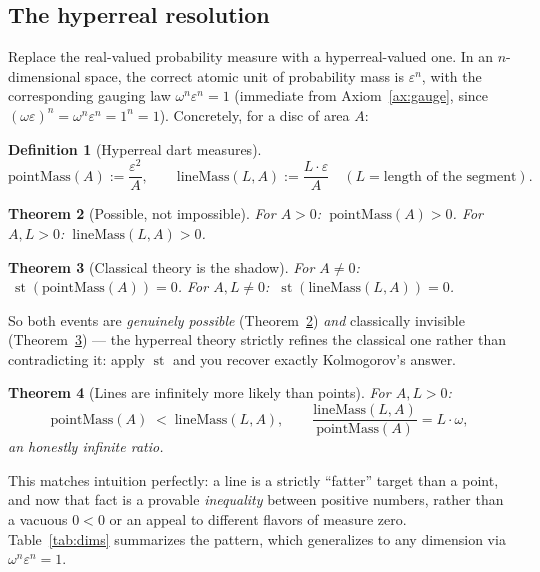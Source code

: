 \documentclass[11pt]{article}
\newtheorem{theorem}{Theorem}[section]
\theoremstyle{definition}
\newtheorem{definition}[theorem]{Definition}
\theoremstyle{remark}
\newcommand{\eps}{\varepsilon}
\newcommand{\st}{\operatorname{st}}
\begin{document}
\subsection{The hyperreal resolution}

Replace the real-valued probability measure with a hyperreal-valued one.
In an $n$-dimensional space, the correct atomic unit of probability mass
is $\eps^n$, with the corresponding gauging law $\omega^n\eps^n = 1$
(immediate from Axiom~\ref{ax:gauge}, since $(\omega\eps)^n = \omega^n\eps^n
= 1^n = 1$). Concretely, for a disc of area $A$:

\begin{definition}[Hyperreal dart measures]
\[
\text{pointMass}(A) := \frac{\eps^2}{A}, \qquad
\text{lineMass}(L,A) := \frac{L\cdot\eps}{A} \quad (L = \text{length of the segment}).
\]
\end{definition}

\begin{theorem}[Possible, not impossible]\label{thm:dart-pos}
For $A>0$: $\ \text{pointMass}(A) > 0$. For $A,L>0$:
$\ \text{lineMass}(L,A) > 0$.
\end{theorem}

\begin{theorem}[Classical theory is the shadow]\label{thm:dart-shadow}
For $A\ne 0$: $\ \st(\text{pointMass}(A)) = 0$. For $A,L\ne0$:
$\ \st(\text{lineMass}(L,A)) = 0$.
\end{theorem}

So both events are \emph{genuinely possible} (Theorem~\ref{thm:dart-pos})
\emph{and} classically invisible (Theorem~\ref{thm:dart-shadow}) — the
hyperreal theory strictly refines the classical one rather than
contradicting it: apply $\st$ and you recover exactly Kolmogorov's answer.

\begin{theorem}[Lines are infinitely more likely than points]\label{thm:dart-ratio}
For $A,L>0$:
\[
\text{pointMass}(A) \;<\; \text{lineMass}(L,A), \qquad
\frac{\text{lineMass}(L,A)}{\text{pointMass}(A)} = L\cdot\omega,
\]
an honestly infinite ratio.
\end{theorem}

This matches intuition perfectly: a line is a strictly ``fatter'' target
than a point, and now that fact is a provable \emph{inequality} between
positive numbers, rather than a vacuous $0 < 0$ or an appeal to different
flavors of measure zero. Table~\ref{tab:dims} summarizes the pattern,
which generalizes to any dimension via $\omega^n\eps^n=1$.
\end{document}
